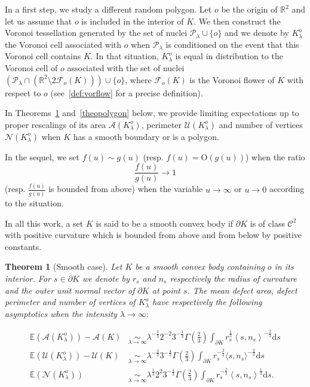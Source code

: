 \documentclass[10pt]{amsart}
\newtheorem{theo}{Theorem}[section]
\theoremstyle{definition}\newtheorem{defi}[theo]{Definition}\newtheorem{rema}[theo]{Remark}\newtheorem{exam}[theo]{Example}\newtheorem{exem}[theo]{Example}\newtheorem{nota}[theo]{Notation}
\newcommand{\cA}{\mathcal{A}}
\newcommand{\cC}{\mathcal{C}}
\newcommand{\cF}{\mathcal{F}}
\newcommand{\cN}{\mathcal{N}}
\newcommand{\cP}{\mathcal{P}}
\newcommand{\cU}{\mathcal{U}}
\newcommand{\la}{\lambda}
\newcommand{\dd}{\mathrm{d}}
\newcommand{\Odd}{\mathrm{O}}
\newcommand{\E}{\mathbb{E}}
\newcommand{\R}{\mathbb{R}}
\newcommand{\pass}{\vspace{0.3cm}\noindent}
\begin{document}
In a first step, we study a different random polygon. Let $o$ be the origin of $\R^2$ and let us assume that $o$ is included in the interior of $K$. We then construct the Voronoi tessellation generated by the set of nuclei $\cP_\la\cup\{o\}$ and we denote by $K_{\lambda}^o$ the Voronoi cell associated with $o$ when $\cP_\lambda$ is conditioned on the event that this Voronoi cell contains $K$. In that situation, $K_{\lambda}^o$ is equal in distribution to the Voronoi cell of $o$ associated with the set of nuclei $(\cP_{\lambda}\cap (\R^2\setminus 2\cF_o(K)))\cup\{o\}$, where $\cF_o(K)$ is the Voronoi flower of $K$ with respect to $o$ (see~\eqref{def:vorflow} for a precise definition).

In Theorems~\ref{theosmooth} and~\ref{theopolygon} below, we provide limiting expectations up to proper rescalings of its area $\cA(K_{\lambda}^o)$, perimeter $\cU(K_{\lambda}^o)$ and number of vertices $\cN(K_{\lambda}^o)$ when $K$ has a smooth boundary or is a polygon.

In the sequel, we set $f(u){\sim} g(u)$ (resp. $f(u){=}\Odd(g(u))$) when the ratio
\[
\frac{f(u)}{g(u)} \to 1
\]
(resp. $\tfrac{f(u)}{g(u)}$ is bounded from above) when the variable $u\to\infty$ or $u\to0$ according to the situation.

In all this work, a set $K$ is said to be a smooth convex body if $\partial K$ is of class $\cC^2$ with positive curvature which is bounded from above and from below by positive constants.

\begin{theo}[Smooth case]\label{theosmooth}
Let $K$ be a smooth convex body containing $o$ in its interior. For $s\in\partial K$ we denote by $r_s$ and $n_s$ respectively the radius of curvature and the outer unit normal vector of $\partial K$ at point $s$. The mean defect area, defect perimeter and number of vertices of $K_{\lambda}^o$ have respectively the following asymptotics when the intensity $\lambda\to\infty:$

\begin{align}
\tag{$\rm i$} \E(\cA(K_{\lambda}^o))-\cA(K)  &\underset{\lambda\to\infty}{\sim}
\lambda^{-\frac{2}{3}} 2^{-2}3^{-\frac1{3}}\Gamma\left(\frac{2}{3}\right)\int_{\partial K} r_s^{\frac1{3}}\left\langle s,n_s\right\rangle^{-\frac{2}{3}}\dd s\label{theo1.1.i}\\
\tag{$\rm ii$} \E(\cU(K_{\lambda}^o))-\cU(K) &\underset{\lambda\to\infty}{\sim}
\lambda^{-\frac{2}{3}} 3^{-\frac{4}{3}}\Gamma\left(\frac{2}{3}\right)\int_{\partial K} r_s^{-\frac{2}{3}}\langle s,n_s\rangle^{-\frac{2}{3}}\dd s \label{theo1.1.ii}\\
\tag{$\rm iii$}\label{theo1.1.iii} \E(\cN(K_{\lambda}^o)) &\underset{\lambda\to\infty}{\sim}
\lambda^{\frac{1}{3}}2^2 3^{-\frac{4}{3}}\Gamma\left(\frac{2}{3}\right)\int_{\partial K} r_s^{-\frac{2}{3}}\left\langle s,n_s\right\rangle^{\frac1{3}}\dd s.
\end{align}
\end{theo}
\end{document}
